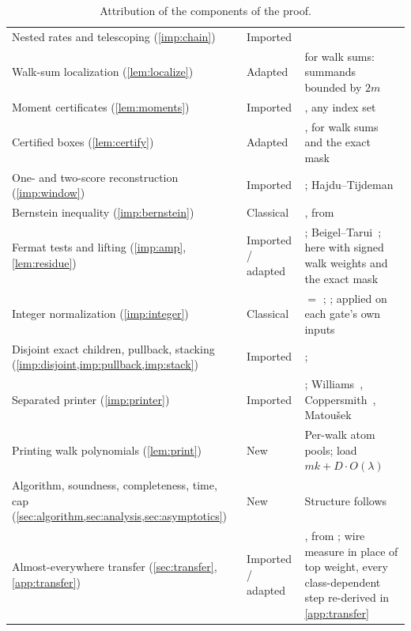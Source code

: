 \begin{table}[!htbp]
\begin{tabularx}{\textwidth}{@{}>{\raggedright\arraybackslash}p{}>{\raggedright\arraybackslash}p{}>{\raggedright\arraybackslash}X@{}}
Nested rates and telescoping (\cref{imp:chain}) & Imported & \cite[Lemma~5.1 and Equation~(1)]{NagCG}\\
Walk-sum localization (\cref{lem:localize}) & Adapted & \cite[Lemma~5.2]{NagCG} for walk sums: summands bounded by \(2m\)\\
Moment certificates (\cref{lem:moments}) & Imported & \cite[Lemma~5.3]{NagCG}, any index set\\
Certified boxes (\cref{lem:certify}) & Adapted & \cite[Sections~7.3 and~8]{NagCG}, for walk sums and the exact mask\\
One- and two-score reconstruction (\cref{imp:window}) & Imported & \cite[Lemmas~4.1--4.4]{NagCG}; Hajdu--Tijdeman~\cite{HT01}\\
Bernstein inequality (\cref{imp:bernstein}) & Classical & \cite[Lemma~3.4]{NagCG}, from~\cite[Theorem~2.8.4]{Vershynin18}\\
Fermat tests and lifting (\cref{imp:amp}, \cref{lem:residue}) & Imported / adapted & \cite[Lemmas~6.6 and~6.7]{NagCG}; Beigel--Tarui~\cite{BT94}; here with signed walk weights and the exact mask\\
Integer normalization (\cref{imp:integer}) & Classical & \cite[Lemma~3.2]{NagCG} \(=\) \cite[Lemma~3.2]{CTW26}; \cite{MTT61}; applied on each gate's own inputs\\
Disjoint exact children, pullback, stacking (\cref{imp:disjoint,imp:pullback,imp:stack}) & Imported & \cite[Lemmas~C.2, C.3, C.6]{Nag72}; \cite{HP10,CW19}\\
Separated printer (\cref{imp:printer}) & Imported & \cite[Theorem~C.5]{Nag72}; Williams~\cite{WilACC14}, Coppersmith~\cite{Cop82}, Matou\v{s}ek~\cite{Mat91}\\
Printing walk polynomials (\cref{lem:print}) & New & Per-walk atom pools; load \(mk+D\cdot O(\lambda)\)\\
Algorithm, soundness, completeness, time, cap (\cref{sec:algorithm,sec:analysis,sec:asymptotics}) & New & Structure follows \cite[Sections~7--9]{NagCG}\\
Almost-everywhere transfer (\cref{sec:transfer}, \cref{app:transfer}) & Imported / adapted & \cite[Section~11 and Appendices~C--D]{NagCG}, from \cite{CLW20,CW19,BW24,MW20,GJS76}; wire measure in place of top weight, every class-dependent step re-derived in \cref{app:transfer}\\
\bottomrule
\end{tabularx}
\caption{Attribution of the components of the proof.}
\label{tab:attribution}
\end{table}


